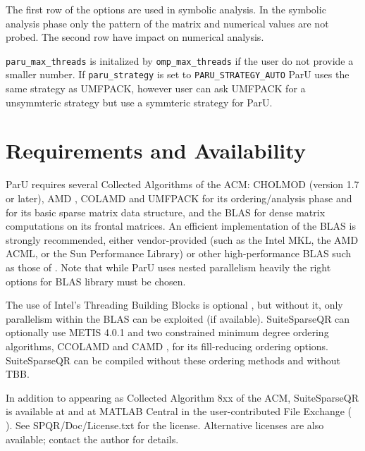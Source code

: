 \documentclass[12pt]{article}
\begin{document}
The first row of the options are used in symbolic analysis. In the symbolic 
analysis phase only the pattern of the matrix and numerical values are not 
probed. The second row have impact on numerical analysis.

\verb'paru_max_threads' is initalized by \verb'omp_max_threads' if the user do 
not provide a smaller number.
If \verb'paru_strategy' is set to \verb'PARU_STRATEGY_AUTO' ParU uses the same 
strategy as UMFPACK, however user can ask UMFPACK for a unsymmteric strategy 
but use a symmteric strategy for ParU.
    
\section{Requirements and Availability}
\label{summary}

ParU requires several Collected Algorithms of the ACM: CHOLMOD
\cite{ChenDavisHagerRajamanickam09,DavisHager09} (version 1.7 or later), AMD
\cite{AmestoyDavisDuff96,AmestoyDavisDuff03}, COLAMD
\cite{DavisGilbertLarimoreNg00_algo,DavisGilbertLarimoreNg00} and UMFPACK 
\cite{10.1145/992200.992206} for its
ordering/analysis phase and for its basic sparse matrix data structure, and the
BLAS \cite{dddh:90} for dense matrix computations on its frontal matrices. 
An efficient implementation of the BLAS is strongly recommended, either
vendor-provided (such as the Intel MKL, the AMD ACML, or the 
Sun Performance Library) or other high-performance BLAS such as those of 
\cite{GotoVanDeGeijn08}. Note that while ParU uses nested parallelism heavily
the right options for BLAS library must be chosen.

The use of Intel's Threading Building Blocks is optional \cite{Reinders07}, but
without it, only parallelism within the BLAS can be exploited (if available).
Suite\-SparseQR can optionally use METIS 4.0.1 \cite{KarypisKumar98e} and two
constrained minimum degree ordering algorithms, CCOLAMD and CAMD
\cite{ChenDavisHagerRajamanickam09}, for its fill-reducing ordering options.
SuiteSparseQR can be compiled without these ordering methods and without TBB.

In addition to appearing as Collected Algorithm 8xx of the ACM, SuiteSparseQR
is available at
and at MATLAB Central
in the user-contributed File Exchange (
).
See SPQR/Doc/License.txt for the license.
Alternative licenses are also
available; contact the author for details.




\end{document}
